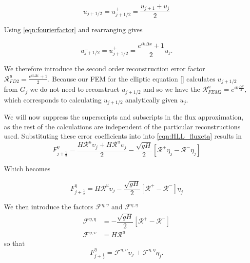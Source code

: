 \begin{equation*}
u^-_{j + 1/2} = u^+_{j + 1/2} = \frac{u_{j+1} + u_{j}}{2}
\end{equation*}

Using \eqref{eqn:fourierfactor} and rearranging gives

\begin{equation}
\label{eqn:2ndreconu}
u^-_{j + 1/2} = u^+_{j + 1/2} = \frac{e^{ik\Delta x } + 1}{2} u_{j}.
\end{equation}

We therefore introduce the second order reconstruction error factor $\mathcal{R}^u_{FD2} = \frac{e^{ik\Delta x } + 1}{2}$. Because our FEM for the elliptic equation [] calculates $u_{j+1/2}$ from $G_j$ we do not need to reconstruct $u_{j+1/2}$ and so we have the $\mathcal{R}^u_{FEM2} = e^{ik\frac{\Delta x}{2} }$, which corresponds to calculating $u_{j+1/2}$ analytically given $u_{j}$. 

We will now suppress the superscripts and subscripts in the flux approximation, as the rest of the calculations are independent of the particular reconstructions used. Substituting these error coefficients into into \eqref{eqn:HLL_fluxeta} results in
\begin{equation*}
F^{\eta}_{j+\frac{1}{2}} = \dfrac{ H  \mathcal{R}^u \upsilon_{j}+ H\mathcal{R}^u \upsilon_{j}}{ 2}  - \dfrac{ \sqrt{gH}}{ 2} \left [  \mathcal{R}^+ {\eta}_j -  \mathcal{R}^-{\eta}_j \right ]
\end{equation*}

Which becomes

\begin{equation*}
F^{\eta}_{j+\frac{1}{2}} = H \mathcal{R}^u \upsilon_{j}   - \dfrac{ \sqrt{gH}}{ 2} \left [  \mathcal{R}^+ -  \mathcal{R}^- \right ] {\eta}_j
\end{equation*}

We then introduce the factors $\mathcal{F}^{\eta,\upsilon}$ and $\mathcal{F}^{\eta,\eta}$
\begin{align*}
\mathcal{F}^{\eta,\eta} & = - \dfrac{ \sqrt{gH}}{ 2} \left [  \mathcal{R}^+ -  \mathcal{R}^- \right ]\\
\mathcal{F}^{\eta,\upsilon} & = H \mathcal{R}^u
\end{align*}
so that
\begin{equation}
\label{eqn:etafluxapprox}
F^{\eta}_{j+\frac{1}{2}} = \mathcal{F}^{\eta,\upsilon} \upsilon_{j}   +  \mathcal{F}^{\eta,\eta} {\eta}_j.
\end{equation}

